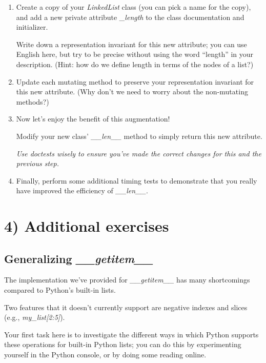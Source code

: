 \documentclass[12pt]{article}
\begin{document}
\begin{enumerate}[1.]
    \item Create a copy of your \textit{LinkedList} class (you can pick a name for the copy),
    and add a new private attribute \textit{\_length} to the class documentation and initializer.

    \bigskip

    Write down a representation invariant for this new attribute; you can use
    English here, but try to be precise without using the word “length” in your
    description. (Hint: how do we define length in terms of the nodes of a list?)

    \item Update each mutating method to preserve your representation invariant for this new attribute.
    (Why don’t we need to worry about the non-mutating methods?)

    \item Now let’s enjoy the benefit of this augmentation!

    \bigskip

    Modify your new class’ \textit{\_\_len\_\_} method to simply return this new
    attribute.

    \textit{Use doctests wisely to ensure you’ve made the correct changes for this and the previous step.}

    \item Finally, perform some additional timing tests to demonstrate that you really have
    improved the efficiency of \textit{\_\_len\_\_}.

\end{enumerate}

\section*{4) Additional exercises}
\subsection*{Generalizing \textit{\_\_getitem\_\_}}
The implementation we’ve provided for \textit{\_\_getitem\_\_} has many shortcomings
compared to Python’s built-in lists.

\bigskip

\noindent Two features that it doesn’t currently support are negative indexes and slices
(e.g., \textit{my\_list[2:5]}).

\bigskip

\noindent Your first task here is to investigate the different ways in which Python
supports these operations for built-in Python lists; you can do this by experimenting
yourself in the Python console, or by doing some reading online.
\end{document}
